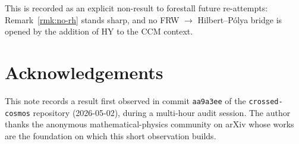 \documentclass[11pt]{article}
\theoremstyle{definition}
\begin{document}
This is recorded as an explicit non-result to forestall future re-attempts: Remark~\ref{rmk:no-rh} stands sharp, and no FRW $\to$ Hilbert--P\'olya bridge is opened by the addition of HY to the CCM context.

\section*{Acknowledgements}

This note records a result first observed in commit \texttt{aa9a3ee} of the \texttt{crossed-cosmos} repository (2026-05-02), during a multi-hour audit session. The author thanks the anonymous mathematical-physics community on arXiv whose works~\cite{Witten2022, CLPW2023, FaulknerSperanza2024, BisognanoWichmann1975, BisognanoWichmann1976, HislopLongo1982} are the foundation on which this short observation builds.



\end{document}

